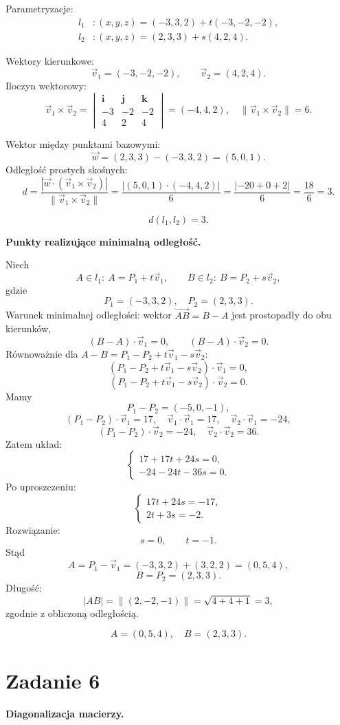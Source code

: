 \documentclass[12pt,a4paper]{article}
\begin{document}
Parametryzacje:
\begin{align*}
l_1&: (x,y,z)=(-3,3,2)+t(-3,-2,-2),\\
l_2&: (x,y,z)=(2,3,3)+s(4,2,4).
\end{align*}

Wektory kierunkowe:
\[
\vec v_1=(-3,-2,-2),\qquad \vec v_2=(4,2,4).
\]
Iloczyn wektorowy:
\[
\vec v_1\times\vec v_2=
\begin{vmatrix}
\mathbf i&\mathbf j&\mathbf k\\
-3&-2&-2\\
4&2&4
\end{vmatrix}
=(-4,4,2),
\quad
\|\vec v_1\times\vec v_2\|=6.
\]

Wektor między punktami bazowymi:
\[
\vec w=(2,3,3)-(-3,3,2)=(5,0,1).
\]
Odległość prostych skośnych:
\[
d=\frac{|\vec w\cdot(\vec v_1\times\vec v_2)|}{\|\vec v_1\times\vec v_2\|}
=\frac{|(5,0,1)\cdot(-4,4,2)|}{6}
=\frac{|-20+0+2|}{6}=\frac{18}{6}=3.
\]

\[
\boxed{d(l_1,l_2)=3.}
\]

\textbf{Punkty realizujące minimalną odległość.}

Niech
\[
A\in l_1:\ A=P_1+t\vec v_1,
\qquad
B\in l_2:\ B=P_2+s\vec v_2,
\]
gdzie
\[
P_1=(-3,3,2),\quad P_2=(2,3,3).
\]
Warunek minimalnej odległości: wektor $\overrightarrow{AB}=B-A$ jest prostopadły do obu kierunków,
\[
(B-A)\cdot\vec v_1=0,
\qquad
(B-A)\cdot\vec v_2=0.
\]
Równoważnie dla $A-B=P_1-P_2+t\vec v_1-s\vec v_2$:
\[
(P_1-P_2+t\vec v_1-s\vec v_2)\cdot\vec v_1=0,
\]
\[
(P_1-P_2+t\vec v_1-s\vec v_2)\cdot\vec v_2=0.
\]
Mamy
\[
P_1-P_2=(-5,0,-1),
\]
\[
(P_1-P_2)\cdot\vec v_1=17,\quad \vec v_1\cdot\vec v_1=17,\quad \vec v_2\cdot\vec v_1=-24,
\]
\[
(P_1-P_2)\cdot\vec v_2=-24,\quad \vec v_2\cdot\vec v_2=36.
\]
Zatem układ:
\[
\begin{cases}
17+17t+24s=0,\\
-24-24t-36s=0.
\end{cases}
\]
Po uproszczeniu:
\[
\begin{cases}
17t+24s=-17,\\
2t+3s=-2.
\end{cases}
\]
Rozwiązanie:
\[
s=0,\qquad t=-1.
\]
Stąd
\[
A=P_1-\vec v_1=(-3,3,2)+(3,2,2)=(0,5,4),
\]
\[
B=P_2=(2,3,3).
\]
Długość:
\[
|AB|=\|(2,-2,-1)\|=\sqrt{4+4+1}=3,
\]
zgodnie z obliczoną odległością.

\[
\boxed{A=(0,5,4),\quad B=(2,3,3).}
\]

\section*{Zadanie 6}
\textbf{Diagonalizacja macierzy.}
\end{document}
